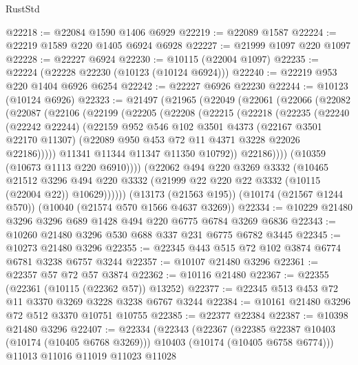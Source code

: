 \begin{lexlean}{RustStd}
\begin{coremodule}
@22218 := @22084 @1590 @1406 @6929
@22219 := @22089 @1587
@22224 := @22219 @1589 @220 @1405 @6924 @6928
@22227 := @21999 @1097 @220 @1097
@22228 := @22227 @6924
@22230 := @10115 (@22004 @1097)
@22235 := @22224 (@22228 @22230 (@10123 (@10124 @6924)))
@22240 := @22219 @953 @220 @1404 @6926 @6254
@22242 := @22227 @6926 @22230
@22244 := @10123 (@10124 @6926)
@22323 := @21497
    (@21965
      (@22049
        (@22061
          (@22066
            (@22082
              (@22087
                (@22106
                  (@22199
                    (@22205
                      (@22208
                        (@22215
                          (@22218
                            (@22235
                              (@22240
                                (@22242 @22244)
                                (@22159
                                  @952
                                  @546
                                  @102
                                  @3501
                                  @4373
                                  (@22167 @3501 @22170 @11307)
                                  (@22089 @950 @453 @72 @11 @4371 @3228 @22026 @22186)))))
                          @11341
                          @11344
                          @11347
                          @11350
                          @10792))
                      @22186))))
              (@10359 (@10673 @1113 @220 @6910))))
          (@22062
            @494
            @220
            @3269
            @3332
            (@10465
              @21512
              @3296
              @494
              @220
              @3332
              (@21999 @22 @220 @22 @3332 (@10115 (@22004 @22)) @10629))))))
    (@13173 (@21563 @195))
    (@10174 (@21567 @1244 @570))
    (@10040 (@21574 @570 @1566 @4637 @3269))
@22334 := @10229 @21480 @3296 @3296 @689 @1428 @494 @220 @6775 @6784 @3269 @6836
@22343 := @10260 @21480 @3296 @530 @688 @337 @231 @6775 @6782 @3445
@22345 := @10273 @21480 @3296
@22355 := @22345 @443 @515 @72 @102 @3874 @6774 @6781 @3238 @6757 @3244
@22357 := @10107 @21480 @3296
@22361 := @22357 @57 @72 @57 @3874
@22362 := @10116 @21480
@22367 := @22355 (@22361 (@10115 (@22362 @57)) @13252)
@22377 := @22345 @513 @453 @72 @11 @3370 @3269 @3228 @3238 @6767 @3244
@22384 := @10161 @21480 @3296 @72 @512 @3370 @10751 @10755
@22385 := @22377 @22384
@22387 := @10398 @21480 @3296
@22407 := @22334
    (@22343
      (@22367
        (@22385 @22387 @10403 (@10174 (@10405 @6768 @3269)))
        @10403
        (@10174 (@10405 @6758 @6774)))
      @11013
      @11016
      @11019
      @11023
      @11028

\end{coremodule}
\end{lexlean}
